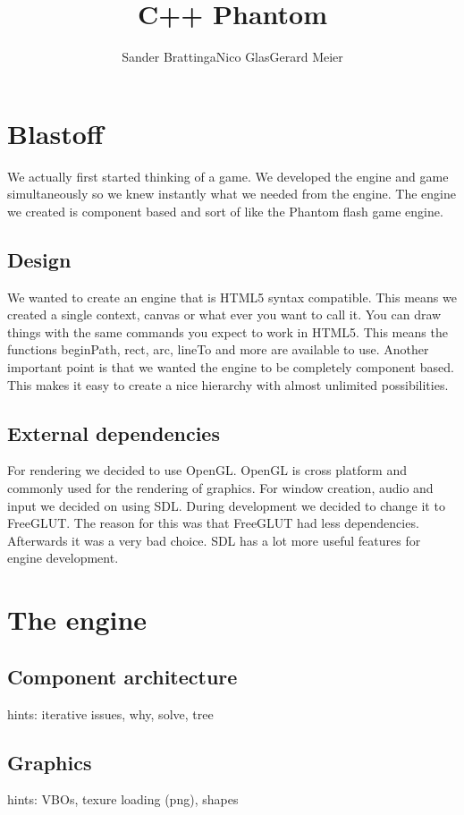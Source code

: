 \documentclass[acmtocl,acmnow]{acmtrans2m}
\title{C++ Phantom}
\author{Sander Brattinga\newline Nico Glas\newline Gerard Meier}
\begin{document}
\begin{bottomstuff}
\end{bottomstuff}

\maketitle
\section{Blastoff}
We actually first started thinking of a game. We developed the engine and game simultaneously so we knew instantly what we needed from the engine. The engine we created is component based and sort of like the Phantom flash game engine. 

\subsection{Design}
We wanted to create an engine that is HTML5 syntax compatible. This means we created a single context, canvas or what ever you want to call it. You can draw things with the same commands you expect to work in HTML5. This means the functions beginPath, rect, arc, lineTo and more are available to use.\newline
Another important point is that we wanted the engine to be completely component based. This makes it easy to create a nice hierarchy with almost unlimited possibilities.

\subsection{External dependencies}
For rendering we decided to use OpenGL. OpenGL is cross platform and commonly used for the rendering of graphics. For window creation, audio and input we decided on using SDL. During development we decided to change it to FreeGLUT. The reason for this was that FreeGLUT had less dependencies. Afterwards it was a very bad choice. SDL has a lot more useful features for engine development.

\section{The engine}
\subsection{Component architecture}
hints: iterative issues, why, solve, tree
\subsection{Graphics}
hints: VBOs, texure loading (png), shapes
\end{document}
